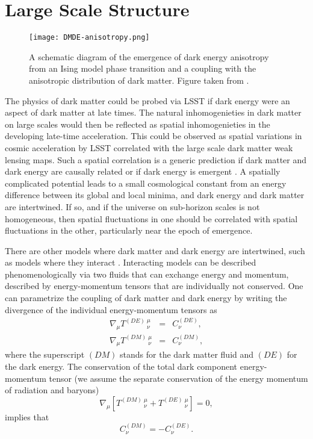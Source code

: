 \section{Large Scale Structure }
\label{sec:lss}

\begin{figure}[t]
\centering
\texttt{[image: DMDE-anisotropy.png]}
\caption{A schematic diagram of the emergence of dark energy anisotropy from an Ising model phase transition and a coupling with the anisotropic distribution of dark matter. Figure taken from \citet{1810.11007}.}
\label{fig:DMDEmap}
\end{figure}

The physics of dark matter could be probed via LSST if dark energy were an aspect of dark matter at late times. 
The natural inhomogenieties in dark matter on large scales would then be reflected as spatial inhomogenieties in the developing late-time acceleration. 
This could be observed as spatial variations in cosmic acceleration by LSST correlated with the large scale dark matter weak lensing maps. 
Such a spatial correlation is a generic prediction if dark matter and dark energy are causally related or if dark energy is emergent \citep{1801.09658}. 
A spatially complicated potential leads to a small cosmological constant from an energy difference between its global and local minima, and dark energy and dark matter are intertwined. 
If so, and if the universe on sub-horizon scales is not homogeneous, then spatial fluctuations in one should be correlated with spatial fluctuations in the other, particularly near the epoch of emergence.

There are other models where dark matter and dark energy are intertwined, such as models where they interact 
\citep{Amendola:1999er,Holden:1999hm}.
Interacting models can be described phenomenologically via two fluids that can exchange energy and momentum, 
described by energy-momentum tensors that are individually not conserved. One can parametrize the coupling of
dark matter and dark energy by writing the divergence of the individual energy-momentum tensors as 
\begin{eqnarray}
\nabla_{\mu} T^{(DE)}\,^{\mu}_{\nu} &=& C^{(DE)}_{\nu}, \label{cons_phi} \\
\nabla_{\mu} T^{(DM)}\,^{\mu}_{\nu} &=& C^{(DM)}_{\nu}, \label{cons_dm}
\end{eqnarray}
where the superscript $(DM)$ stands for the dark matter fluid and $(DE)$ for the dark energy.
The conservation of the total dark component energy-momentum tensor 
(we assume the separate conservation of the energy momentum of radiation and baryons)
\begin{equation}
\label{energyconservation}
\nabla_{\mu} \left[ T^{(DM)} \,^{\mu}_{\nu} + T^{(DE)} \,^{\mu}_{\nu} \right]= 0,
\end{equation}
implies that
\begin{equation}
C^{(DM)}_{\nu}=-C^{(DE)}_{\nu}.
\end{equation}

